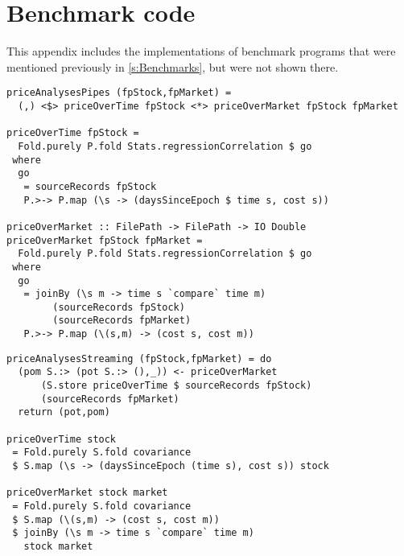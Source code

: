 \chapter{Benchmark code}
\label{app:Benchmarks}

This appendix includes the implementations of benchmark programs that were mentioned previously in \cref{s:Benchmarks}, but were not shown there.

% 
% 

\begin{lstlisting}[float=ht,label=l:a:bench:priceAnalysesPipes,caption=Pipes two-pass implementation of \Hs/priceAnalyses/]
priceAnalysesPipes (fpStock,fpMarket) =
  (,) <$> priceOverTime fpStock <*> priceOverMarket fpStock fpMarket

priceOverTime fpStock = 
  Fold.purely P.fold Stats.regressionCorrelation $ go
 where
  go
   = sourceRecords fpStock
   P.>-> P.map (\s -> (daysSinceEpoch $ time s, cost s)) 

priceOverMarket :: FilePath -> FilePath -> IO Double
priceOverMarket fpStock fpMarket = 
  Fold.purely P.fold Stats.regressionCorrelation $ go
 where
  go
   = joinBy (\s m -> time s `compare` time m)
        (sourceRecords fpStock)
        (sourceRecords fpMarket)
   P.>-> P.map (\(s,m) -> (cost s, cost m)) 
\end{lstlisting}

\begin{lstlisting}[float=ht,label=l:a:bench:priceAnalysesStreaming,caption=Streaming implementation of \Hs/priceAnalyses/]
priceAnalysesStreaming (fpStock,fpMarket) = do
  (pom S.:> (pot S.:> (),_)) <- priceOverMarket
      (S.store priceOverTime $ sourceRecords fpStock)
      (sourceRecords fpMarket)
  return (pot,pom)

priceOverTime stock
 = Fold.purely S.fold covariance
 $ S.map (\s -> (daysSinceEpoch (time s), cost s)) stock

priceOverMarket stock market
 = Fold.purely S.fold covariance
 $ S.map (\(s,m) -> (cost s, cost m))
 $ joinBy (\s m -> time s `compare` time m)
   stock market
\end{lstlisting}


